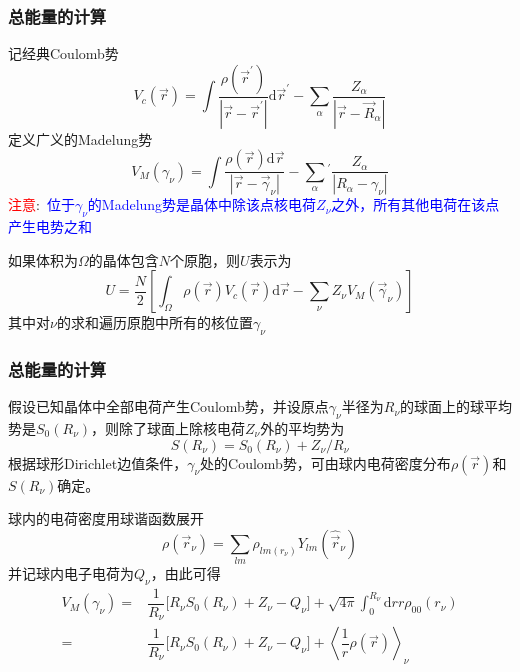 \documentclass[cjk,slidestop,compress,mathserif,blue]{beamer}
\begin{document}
\frame
{
	\frametitle{总能量的计算}
	记经典\textrm{Coulomb}势
	\begin{displaymath}
		V_c(\vec r)=\int\dfrac{\rho(\vec r^{\prime})}{|\vec r-\vec r^{\prime}|}\mathrm{d}\vec r^{\prime}-\sum_{\alpha}\dfrac{Z_{\alpha}}{|\vec r-\vec R_{\alpha}|}
	\end{displaymath}
	定义广义的\textrm{Madelung}势
	\begin{displaymath}
		V_M(\gamma_{\nu})=\int\dfrac{\rho(\vec r)\mathrm{d}\vec r}{|\vec r-\vec \gamma_{\nu}|}-\sum_{\alpha}{}^{\prime}\dfrac{Z_{\alpha}}{|R_{\alpha}-\gamma_{\nu}|}
	\end{displaymath}
	\textcolor{red}{注意}:~\textcolor{blue}{位于\textrm{$\gamma_{\nu}$的Madelung}势是晶体中除该点核电荷$Z_{\nu}$之外，所有其他电荷在该点产生电势之和}

	如果体积为$\Omega$的晶体包含$N$个原胞，则$U$表示为
	\begin{displaymath}
		U=\dfrac N2\left[\int_{\Omega}\rho(\vec r)V_c(\vec r)\mathrm{d}\vec r-\sum_{\nu}Z_{\nu}V_M(\vec \gamma_{\nu})\right]
	\end{displaymath}
	其中对$\nu$的求和遍历原胞中所有的核位置$\gamma_{\nu}$
}

\frame
{
	\frametitle{总能量的计算}
	假设已知晶体中全部电荷产生\textrm{Coulomb}势，并设原点$\gamma_{\nu}$半径为$R_{\nu}$的球面上的球平均势是$S_0(R_{\nu})$，则除了球面上除核电荷$Z_{\nu}$外的平均势为
	\begin{displaymath}
		S(R_{\nu})=S_0(R_{\nu})+Z_{\nu}/R_{\nu}
	\end{displaymath}
	根据球形\textrm{Dirichlet}边值条件，$\gamma_{\nu}$处的\textrm{Coulomb}势，可由球内电荷密度分布$\rho(\vec r)$和$S(R_{\nu})$确定。

	球内的电荷密度用球谐函数展开
	\begin{displaymath}
		\rho(\vec r_{\nu})=\sum_{lm}\rho_{lm(r_{\nu})}Y_{lm}(\hat{\vec r}_{\nu})
	\end{displaymath}
	并记球内电子电荷为$Q_{\nu}$，由此可得
	\begin{displaymath}
		\begin{aligned}
			V_M(\gamma_{\nu})=&\dfrac1{R_{\nu}}\big[R_{\nu}S_0(R_{\nu})+Z_{\nu}-Q_{\nu}\big]+\sqrt{4\pi}\int_0^{R_{\nu}}\mathrm{d}rr\rho_{00}(r_{\nu})\\
			=&\dfrac1{R_{\nu}}\big[R_{\nu}S_0(R_{\nu})+Z_{\nu}-Q_{\nu}\big]+\left\langle\dfrac1r\rho(\vec r)\right\rangle_{\nu}
		\end{aligned}
	\end{displaymath}
}
\end{document}

